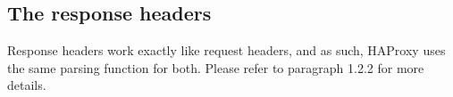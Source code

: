 
\subsection{The response headers}

Response headers work exactly like request headers, and as such, HAProxy uses
the same parsing function for both. Please refer to paragraph 1.2.2 for more
details.

